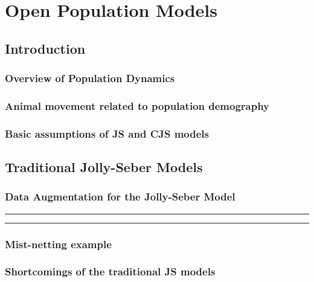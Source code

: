 \chapter{Open Population Models}
\label{chapt.open}

\section{Introduction}


\subsection{Overview of Population Dynamics}


\subsection{Animal movement related to population demography}

\subsection{Basic assumptions of JS and CJS models}

\section{Traditional Jolly-Seber Models}

\begin{figure}[h]
\centering
\label{open.figs.robustdesign}
\end{figure}

\subsection{Data Augmentation for the Jolly-Seber Model}


\begin{panel}[htp]
\centering
\rule[0.1in]{\textwidth}{.03in}
\rule[-0.1in]{\textwidth}{.03in}
\label{open.panel.nsJS}
\end{panel}



\subsection{Mist-netting example}


\subsection{Shortcomings of the traditional JS models}

